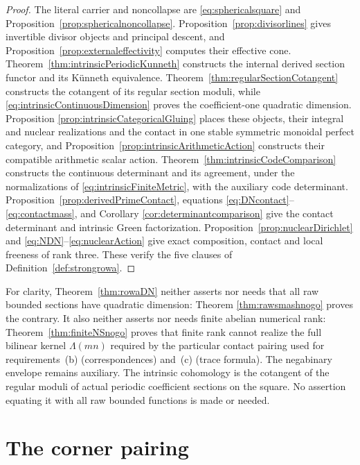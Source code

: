 \documentclass[11pt]{amsart}
\theoremstyle{definition}
\theoremstyle{remark}
\begin{document}
\begin{proof}
The literal carrier and noncollapse are
\eqref{eq:sphericalsquare} and Proposition~\ref{prop:sphericalnoncollapse}.
Proposition~\ref{prop:divisorlines} gives invertible divisor objects and
principal descent, and Proposition~\ref{prop:externaleffectivity} computes
their effective cone.  Theorem~\ref{thm:intrinsicPeriodicKunneth} constructs
the internal derived section functor and its K\"unneth equivalence.
Theorem~\ref{thm:regularSectionCotangent} constructs the cotangent of its
regular section moduli, while \eqref{eq:intrinsicContinuousDimension}
proves the coefficient-one quadratic dimension.  Proposition
\ref{prop:intrinsicCategoricalGluing} places these objects, their integral
and nuclear realizations and the contact in one stable symmetric monoidal
perfect category, and Proposition~\ref{prop:intrinsicArithmeticAction}
constructs their compatible arithmetic scalar action.
Theorem~\ref{thm:intrinsicCodeComparison} constructs the
continuous determinant and its agreement, under the normalizations of
\eqref{eq:intrinsicFiniteMetric}, with the auxiliary code determinant.
Proposition~\ref{prop:derivedPrimeContact}, equations
\eqref{eq:DNcontact}--\eqref{eq:contactmass}, and Corollary
\ref{cor:determinantcomparison} give the contact determinant and intrinsic
Green factorization.
Proposition~\ref{prop:nuclearDirichlet}
and \eqref{eq:NDN}--\eqref{eq:nuclearAction} give exact composition,
contact and local freeness of rank three.  These verify the five clauses of
Definition~\ref{def:strongrowa}.
\end{proof}

For clarity, Theorem~\ref{thm:rowaDN} neither asserts nor needs that
all raw bounded sections have quadratic dimension: Theorem
\ref{thm:rawsmashnogo} proves the contrary.  It also neither asserts nor
needs finite abelian numerical rank: Theorem~\ref{thm:finiteNSnogo} proves
that finite rank cannot realize the full bilinear kernel $\Lambda(mn)$
required by the particular contact pairing used for requirements~(b)
(correspondences) and~(c) (trace formula).
The negabinary envelope remains auxiliary.  The intrinsic cohomology is
the cotangent of the regular moduli of actual periodic coefficient sections
on the square.  No assertion equating it with all raw bounded functions is
made or needed.


\section{The corner pairing}
\label{sec:cornerpairing}
\end{document}
